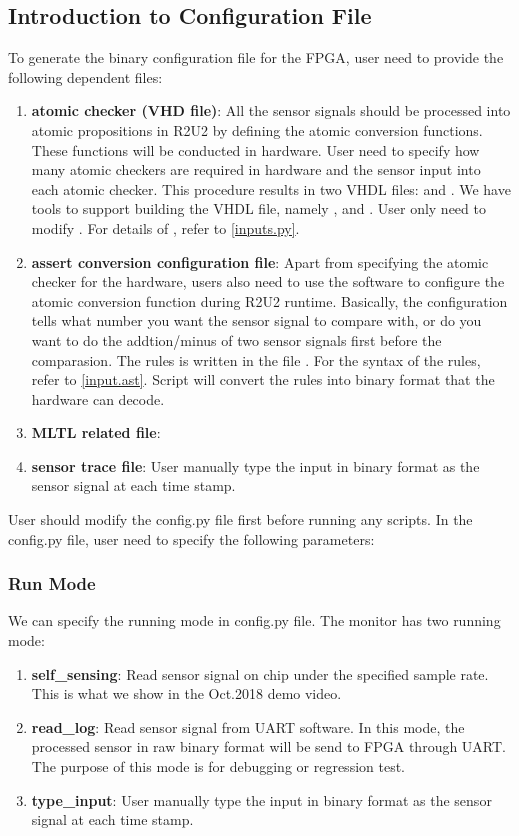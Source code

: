 \subsection{Introduction to Configuration File}
To generate the binary configuration file for the FPGA, user need to provide the following dependent files:
\begin{enumerate}
	\item \textbf{atomic checker (VHD file)}:
	All the sensor signals should be processed into atomic propositions in R2U2 by defining the atomic conversion functions. These functions will be conducted in hardware. User need to specify how many atomic checkers are required in hardware and the sensor input into each atomic checker. This procedure results in two VHDL files:  and . We have tools to support building the VHDL file, namely ,  and . User only need to modify . For details of , refer to \ref{inputs.py}.

	\item \textbf{assert conversion configuration file}:
	Apart from specifying the atomic checker for the hardware, users also need to use the software to configure the atomic conversion function during R2U2 runtime. Basically, the configuration tells what number you want the sensor signal to compare with, or do you want to do the addtion/minus of two sensor signals first before the comparasion. The rules is written in the file . For the syntax of the rules, refer to \ref{input.ast}. Script  will convert the rules into binary format that the hardware can decode.
	\item \textbf{MLTL related file}:
	
	\item \textbf{sensor trace file}:
	User manually type the input in binary format as the sensor signal at each time stamp.
\end{enumerate}
User should modify the config.py file first before running any scripts. In the config.py file, user need to specify the following parameters:

\subsubsection{Run Mode}
We can specify the running mode in config.py file. The monitor has two running mode:
\begin{enumerate}
	\item \textbf{self\_sensing}:
	Read sensor signal on chip under the specified sample rate. This is what we show in the Oct.2018 demo video.
	\item \textbf{read\_log}:
	Read sensor signal from UART software. In this mode, the processed sensor in raw binary format will be send to FPGA through UART. The purpose of this mode is for debugging or regression test.
	\item \textbf{type\_input}:
	User manually type the input in binary format as the sensor signal at each time stamp.
\end{enumerate}

